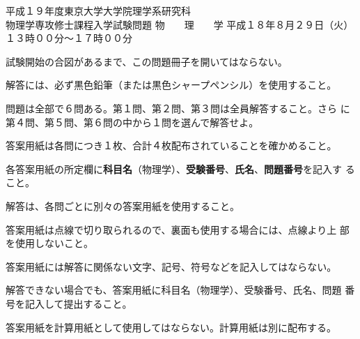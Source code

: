 \begin{inshicover}%
  {平成１９年度東京大学大学院理学系研究科\\物理学専攻修士課程入学試験問題}%
  {物　　理　　学}%
  {平成１８年８月２９日（火）　１３時００分〜１７時００分}
\item 試験開始の合図があるまで、この問題冊子を開いてはならない。
\item 解答には、必ず黒色鉛筆（または黒色シャープペンシル）を使用すること。
\item 問題は全部で６問ある。第１問、第２問、第３問は全員解答すること。さら
      に第４問、第５問、第６問の中から１問を選んで解答せよ。
\item 答案用紙は各問につき１枚、合計４枚配布されていることを確かめること。
\item 各答案用紙の所定欄に{\bf 科目名}（物理学）、{\bf 受験番号}、{\bf 氏名}、{\bf 問題番号}を記入す
      ること。
\item 解答は、各問ごとに別々の答案用紙を使用すること。
\item 答案用紙は点線で切り取られるので、裏面も使用する場合には、点線より上
      部を使用しないこと。
\item 答案用紙には解答に関係ない文字、記号、符号などを記入してはならない。
\item 解答できない場合でも、答案用紙に科目名（物理学）、受験番号、氏名、問題
      番号を記入して提出すること。
\item 答案用紙を計算用紙として使用してはならない。計算用紙は別に配布する。
\end{inshicover}
